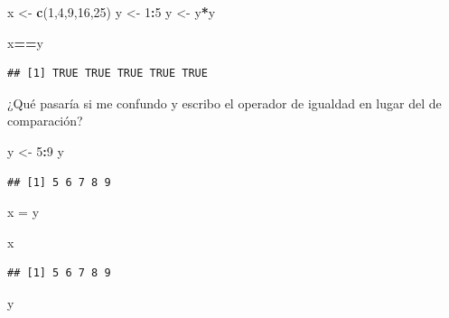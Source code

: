 \documentclass[
]{book}
\newenvironment{Shaded}{\begin{snugshade}}{\end{snugshade}}
\newcommand{\DecValTok}[1]{\textcolor[rgb]{0.00,0.00,0.81}{#1}}
\newcommand{\FunctionTok}[1]{\textcolor[rgb]{0.13,0.29,0.53}{\textbf{#1}}}
\newcommand{\NormalTok}[1]{#1}
\newcommand{\OtherTok}[1]{\textcolor[rgb]{0.56,0.35,0.01}{#1}}
\newcommand{\SpecialCharTok}[1]{\textcolor[rgb]{0.81,0.36,0.00}{\textbf{#1}}}
\begin{document}
\begin{Shaded}
\begin{Highlighting}[]
\NormalTok{x }\OtherTok{\textless{}{-}} \FunctionTok{c}\NormalTok{(}\DecValTok{1}\NormalTok{,}\DecValTok{4}\NormalTok{,}\DecValTok{9}\NormalTok{,}\DecValTok{16}\NormalTok{,}\DecValTok{25}\NormalTok{)}
\NormalTok{y }\OtherTok{\textless{}{-}} \DecValTok{1}\SpecialCharTok{:}\DecValTok{5}
\NormalTok{y }\OtherTok{\textless{}{-}}\NormalTok{ y}\SpecialCharTok{*}\NormalTok{y}
\end{Highlighting}
\end{Shaded}

\begin{Shaded}
\begin{Highlighting}[]
\NormalTok{x}\SpecialCharTok{==}\NormalTok{y}
\end{Highlighting}
\end{Shaded}

\begin{verbatim}
## [1] TRUE TRUE TRUE TRUE TRUE
\end{verbatim}

¿Qué pasaría si me confundo y escribo el operador de igualdad en lugar del de comparación?

\begin{Shaded}
\begin{Highlighting}[]
\NormalTok{y }\OtherTok{\textless{}{-}} \DecValTok{5}\SpecialCharTok{:}\DecValTok{9}
\NormalTok{y}
\end{Highlighting}
\end{Shaded}

\begin{verbatim}
## [1] 5 6 7 8 9
\end{verbatim}

\begin{Shaded}
\begin{Highlighting}[]
\NormalTok{x }\OtherTok{=}\NormalTok{ y}
\end{Highlighting}
\end{Shaded}

\begin{Shaded}
\begin{Highlighting}[]
\NormalTok{x}
\end{Highlighting}
\end{Shaded}

\begin{verbatim}
## [1] 5 6 7 8 9
\end{verbatim}

\begin{Shaded}
\begin{Highlighting}[]
\NormalTok{y}
\end{Highlighting}
\end{Shaded}
\end{document}
